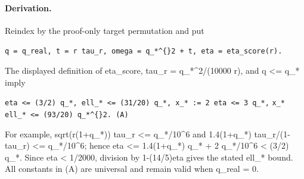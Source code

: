 \paragraph{Derivation.}

Reindex by the proof-only target permutation and put

\texttt{q = q\_real,  t = r tau\_r,  omega = q\_*\textasciicircum\{\}2 + t,  eta = eta\_score(r).}

The displayed definition of eta\_score, tau\_r = q\_*\textasciicircum{}2/(10000 r), and
q <= q\_* imply

\texttt{eta <= (3/2) q\_*,       ell\_* <= (31/20) q\_*,       x\_* := 2 eta <= 3 q\_*,}
\texttt{x\_* ell\_* <= (93/20) q\_*\textasciicircum\{\}2.                                    (A)}

For example,
sqrt(r(1+q\_*)) tau\_r <= q\_*/10\textasciicircum{}6 and
1.4(1+q\_*) tau\_r/(1-tau\_r) <= q\_*/10\textasciicircum{}6; hence
eta <= 1.4(1+q\_*) q\_* + 2 q\_*/10\textasciicircum{}6 < (3/2) q\_*.
Since eta < 1/2000, division by 1-(14/5)eta gives the stated ell\_* bound.
All constants in (A) are universal and remain valid when q\_real = 0.


